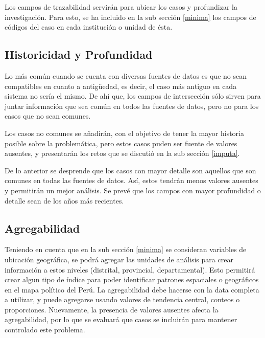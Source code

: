 \documentclass{article}
\begin{document}
Los {campos de trazabilidad} servirán para ubicar los casos y profundizar la investigación. Para esto, se ha incluido en la sub sección \ref{minima} los campos de códigos del caso en cada institución o unidad de ésta.

\subsection{Historicidad y Profundidad}

Lo más común cuando se cuenta con diversas fuentes de datos es que no sean compatibles en cuanto a antigüedad, es decir, el caso más antiguo en cada sistema no sería el mismo. De ahí que, los campos de intersección sólo sirven para juntar información que sea común en todos las fuentes de datos, pero no para los casos que no sean comunes. 

Los casos no comunes se añadirán, con el objetivo de tener la mayor historia posible sobre la problemática, pero estos casos puden ser fuente de valores ausentes, y presentarán los retos que se discutió en la sub sección \ref{imputa}. 

De lo anterior se desprende que los casos con mayor detalle son aquellos que son comunes en todas las fuentes de datos. Así, estos tendrán menos valores ausentes y permitirán un mejor análisis. Se prevé que los campos con mayor profundidad o detalle sean de los años más recientes.

\subsection{Agregabilidad}

Teniendo en cuenta que en la sub sección \ref{minima} se consideran variables de ubicación geográfica, se podrá agregar las unidades de análisis para crear información a estos niveles (distrital, provincial, departamental). Esto permitirá crear algun tipo de índice para poder identificar patrones espaciales o geográficos en el mapa político del Perú. La agregabilidad debe hacerse con la data completa a utilizar, y puede agregarse usando valores de tendencia central, conteos o proporciones. Nuevamente, la presencia de valores ausentes afecta la agregabilidad, por lo que se evaluará que casos se incluirán para mantener controlado este problema.   




\end{document}
